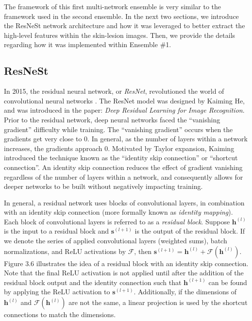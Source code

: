 \documentclass [MAS] {uclathes}
\begin{document}
The framework of this first multi-network ensemble is very similar to the framework used in the second ensemble. In the next two sections, we introduce the ResNeSt network architecture and how it was leveraged to better extract the high-level features within the skin-lesion images. Then, we provide the details regarding how it was implemented within Ensemble \#1.

\subsection{ResNeSt}

In 2015, the residual neural network, or \textit{ResNet}, revolutioned the world of convolutional neural networks \cite{resnet}. The ResNet model was designed by Kaiming He, and was introduced in the paper: \textit{Deep Residual Learning for Image Recognition}. Prior to the residual network, deep neural networks faced the ``vanishing gradient'' difficulty while training. The ``vanishing gradient'' occurs when the gradients get very close to 0. In general, as the number of layers within a network increases, the gradients approach 0. Motivated by Taylor expansion, Kaiming introduced the technique known as the ``identity skip connection'' or ``shortcut connection''. An identity skip connection reduces the effect of gradient vanishing regardless of the number of layers within a network, and consequently allows for deeper networks to be built without negatively impacting training. 

In general, a residual network uses blocks of convolutional layers, in combination with an identity skip connection (more formally known as \textit{identity mapping}). Each block of convolutional layers is referred to as a \textit{residual block}. Suppose $\mathbf{h}^{(l)}$ is the input to a residual block and $\mathbf{s}^{(l+1)}$ is the output of the residual block. If we denote the series of applied convolutional layers (weighted sums), batch normalizations, and ReLU activations by $\mathcal{F}$, then $\mathbf{s}^{(l+1)} = \mathbf{h}^{(l)} + \mathcal{F}(\mathbf{h}^{(l)})$. Figure 3.6 illustrates the idea of a residual block with an identity skip connection. Note that the final ReLU activation is not applied until after the addition of the residual block output and the identity connection such that $\mathbf{h}^{(l+1)}$ can be found by applying the ReLU activation to $\mathbf{s}^{(l+1)}$. Additionally, if the dimensions of $\mathbf{h}^{(l)}$ and $\mathcal{F}(\mathbf{h}^{(l)})$ are not the same, a linear projection is used by the shortcut connections to match the dimensions.
\end{document}
